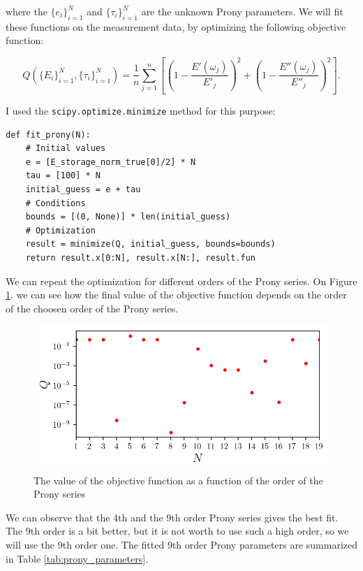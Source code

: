\documentclass[12pt,a4paper]{article}
\begin{document}
where the $\{e_i\}_{i=1}^N$ and $\{\tau_i\}_{i=1}^N$ are the unknown Prony parameters. We will fit these functions on the measurement data, by optimizing the following objective function:

\begin{equation}
    Q\left(\{E_i\}_{i=1}^N,\{\tau_i\}_{i=1}^N\right) = 
\frac{1}{n}\sum_{j=1}^n \left[\left(1-\frac{E'(\omega_j)}{E'_j}\right)^2 + \left(1-\frac{E''(\omega_j)}{E''_j}\right)^2\right].
\end{equation}


I used the \texttt{scipy.optimize.minimize} method for this purpose:  

\lstset{style=python}
\begin{lstlisting}
def fit_prony(N):
    # Initial values
    e = [E_storage_norm_true[0]/2] * N
    tau = [100] * N
    initial_guess = e + tau
    # Conditions
    bounds = [(0, None)] * len(initial_guess)
    # Optimization
    result = minimize(Q, initial_guess, bounds=bounds)
    return result.x[0:N], result.x[N:], result.fun
\end{lstlisting}

\newpage

We can repeat the optimization for different orders of the Prony series. On Figure \ref{fig:prony_order}. we can see how the final value of the objective function depends on the order of the choosen order of the Prony series.

\begin{figure}[H]
    \centering
    \includegraphics[scale=0.9]{figures/best_prony.png}
    \caption{The value of the objective function as a function of the order of the Prony series}
    \label{fig:prony_order}
\end{figure}

We can observe that the 4th and the 9th order Prony series gives the best fit. The 9th order is a bit better, but it is not worth to use such a high order, so we will use the 9th order one. The fitted 9th order Prony parameters are summarized in  Table \ref{tab:prony_parameters}.
\end{document}
